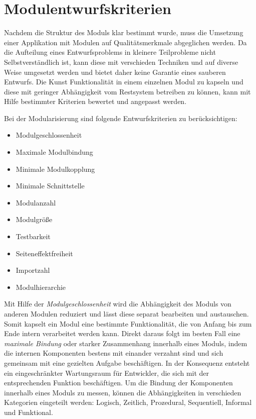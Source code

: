   \section{Modulentwurfskriterien} \label{sec:MEK}
    Nachdem die Struktur des Moduls klar bestimmt wurde, muss die Umsetzung einer Applikation mit Modulen auf Qualitätsmerkmale abgeglichen werden. Da die Aufteilung eines Entwurfsproblems in kleinere Teilprobleme nicht Selbstverständlich ist, kann diese mit verschieden Techniken und auf diverse Weise umgesetzt werden und bietet daher keine Garantie eines sauberen Entwurfs. Die Kunst Funktionalität in einem einzelnen Modul zu kapseln und diese mit geringer Abhängigkeit vom Restsystem betreiben zu können, kann mit Hilfe bestimmter Kriterien bewertet und angepasst werden. \bigbreak
    
    Bei der Modularisierung sind folgende Entwurfskriterien zu berücksichtigen: 
    \begin{itemize}
      \item Modulgeschlossenheit 
      \item Maximale Modulbindung 
      \item Minimale Modulkopplung 
      \item Minimale Schnittstelle 
      \item Modulanzahl 
      \item Modulgröße 
      \item Testbarkeit 
      \item Seiteneffektfreiheit 
      \item Importzahl 
      \item Modulhierarchie 
    \end{itemize}
    Mit Hilfe der \textit{Modulgeschlossenheit} wird die Abhängigkeit des Moduls von anderen Modulen reduziert und lässt diese separat bearbeiten und austauschen. Somit kapselt ein Modul eine bestimmte Funktionalität, die von Anfang bis zum Ende intern verarbeitet werden kann. Direkt daraus folgt im besten Fall eine \textit{maximale Bindung} oder starker Zusammenhang innerhalb eines Moduls, indem die internen Komponenten bestens mit einander verzahnt sind und sich gemeinsam mit eine gezielten Aufgabe beschäftigen. In der Konsequenz entsteht ein eingeschränkter Wartungsraum für Entwickler, die sich mit der entsprechenden Funktion beschäftigen. Um die Bindung der Komponenten innerhalb eines Moduls zu messen, können die Abhängigkeiten in verschieden Kategorien eingeteilt werden: Logisch, Zeitlich, Prozedural, Sequentiell, Informal und Funktional.

